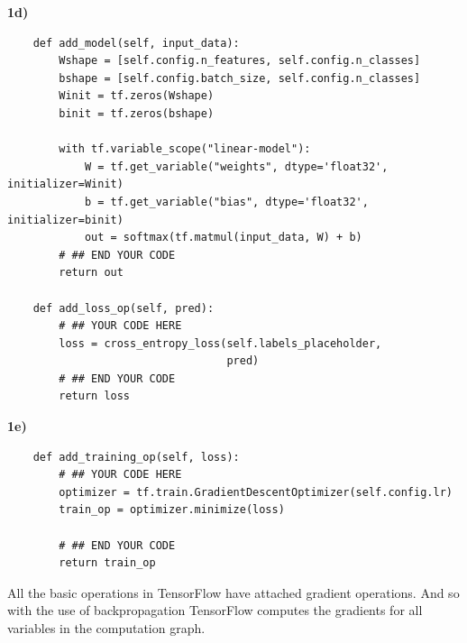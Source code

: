 \documentclass{article}
\begin{document}
\textbf{1d)}
\begin{verbatim}
    def add_model(self, input_data):
        Wshape = [self.config.n_features, self.config.n_classes]
        bshape = [self.config.batch_size, self.config.n_classes]
        Winit = tf.zeros(Wshape)
        binit = tf.zeros(bshape)

        with tf.variable_scope("linear-model"):
            W = tf.get_variable("weights", dtype='float32', initializer=Winit)
            b = tf.get_variable("bias", dtype='float32', initializer=binit)
            out = softmax(tf.matmul(input_data, W) + b)
        # ## END YOUR CODE
        return out

    def add_loss_op(self, pred):
        # ## YOUR CODE HERE
        loss = cross_entropy_loss(self.labels_placeholder,
                                  pred)
        # ## END YOUR CODE
        return loss
\end{verbatim}


\textbf{1e)}
\begin{verbatim}
    def add_training_op(self, loss):
        # ## YOUR CODE HERE
        optimizer = tf.train.GradientDescentOptimizer(self.config.lr)
        train_op = optimizer.minimize(loss)

        # ## END YOUR CODE
        return train_op
\end{verbatim}
All the basic operations in TensorFlow have attached
gradient operations. And so with the use of backpropagation TensorFlow computes the gradients for all variables in the computation graph.
\end{document}
